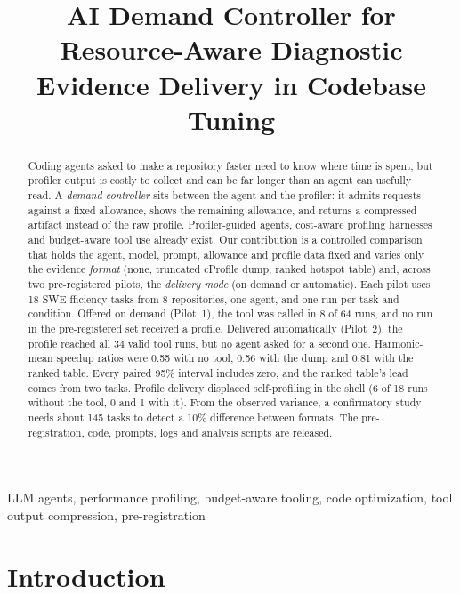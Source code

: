 \documentclass[conference]{IEEEtran}
\begin{document}
\title{AI Demand Controller for Resource-Aware Diagnostic Evidence Delivery in Codebase Tuning}

\author{
}

\maketitle

\begin{abstract}
Coding agents asked to make a repository faster need to know where time is
spent, but profiler output is costly to collect and can be far longer than an
agent can usefully read. A \emph{demand controller} sits between the agent and
the profiler: it admits requests against a fixed allowance, shows the remaining
allowance, and returns a compressed artifact instead of the raw profile.
Profiler-guided agents, cost-aware profiling harnesses and budget-aware tool
use already exist. Our contribution is a controlled comparison that holds the
agent, model, prompt, allowance and profile data fixed and varies only the
evidence \emph{format} (none, truncated cProfile dump, ranked hotspot table)
and, across two pre-registered pilots, the \emph{delivery mode} (on demand or
automatic). Each pilot uses 18 SWE-fficiency tasks from 8 repositories, one
agent, and one run per task and condition. Offered on demand (Pilot~1), the
tool was called in 8 of 64 runs, and no run in the pre-registered set
received a profile.
Delivered automatically (Pilot~2), the profile reached all 34 valid tool runs,
but no agent asked for a second one. Harmonic-mean speedup ratios were 0.55
with no tool, 0.56 with the dump and 0.81 with the ranked table. Every paired
95\% interval includes zero, and the ranked table's lead comes from two
tasks. Profile delivery displaced self-profiling in the shell (6 of 18 runs
without the tool, 0 and 1 with it). From the observed variance, a confirmatory
study needs about 145 tasks to detect a 10\% difference between formats. The
pre-registration, code, prompts, logs and analysis scripts are released.
\end{abstract}

\begin{IEEEkeywords}
LLM agents, performance profiling, budget-aware tooling, code optimization,
tool output compression, pre-registration
\end{IEEEkeywords}

\section{Introduction}
\end{document}
